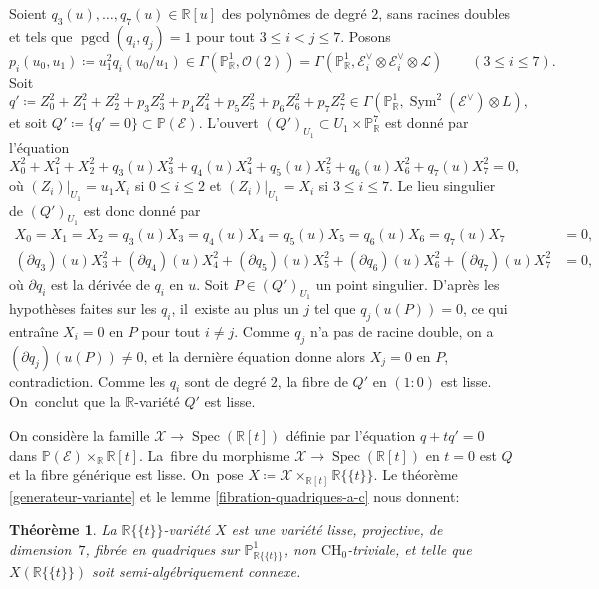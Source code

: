 \documentclass[11pt]{article}
\newcommand{\CH}{\mathrm{CH}}
\newtheorem{thm}{Théorème}[section]
\theoremstyle{definition}
\newcommand{\R}{\mathbb R}
\renewcommand{\P}{\mathbb P}
\newcommand{\mc}[1]{\mathcal{#1}}
\newcommand{\on}[1]{\operatorname{#1}}
\newcommand{\puiseux}{\mathbb{R}\{\!\{t\}\!\}}
\begin{document}
Soient $q_3(u),\dots,q_7(u)\in \R[u]$ des polynômes de degré $2$, sans racines doubles et tels que $\on{pgcd}(q_i,q_j)=1$ pour tout $3\leq i<j\leq 7$. Posons
\[p_i(u_0,u_1)\coloneqq u_1^2q_i(u_0/u_1)\in \Gamma(\P^1_\R,\mc{O}(2))=\Gamma(\P^1_\R,\mc{E}_i^\vee\otimes \mc{E}_i^\vee\otimes \mc{L})\qquad (3\leq i\leq 7).\]
Soit
\[q'\coloneqq Z_0^2+Z_1^2+Z_2^2+p_3Z_3^2+p_4Z_4^2+p_5Z_5^2+p_6Z_6^2+p_7Z_7^2\in \Gamma(\P^1_\R, \on{Sym}^2(\mc{E}^\vee)\otimes L),\]
et soit $Q'\coloneqq \{q'=0\}\subset \P(\mc{E})$. L'ouvert $(Q')_{U_1}\subset U_1\times \P^7_\R$ est donné par l'équation
\[X_0^2+X_1^2+X_2^2+q_3(u)X_3^2+q_4(u)X_4^2+q_5(u)X_5^2+q_6(u)X_6^2+q_7(u)X_7^2=0,\]
où $(Z_i)|_{U_1}=u_1X_i$ si $0\leq i\leq 2$ et $(Z_i)|_{U_1}=X_i$ si $3\leq i\leq 7$.
Le lieu singulier de $(Q')_{U_1}$ est donc donné par
\begin{align*}
X_0=X_1=X_2=q_3(u)X_3=q_4(u)X_4=q_5(u)X_5=q_6(u)X_6=q_7(u)X_7&=0,\\
(\partial q_3)(u)X_3^2+(\partial q_4)(u)X_4^2+(\partial q_5)(u)X_5^2+(\partial q_6)(u)X_6^2+(\partial q_7)(u)X_7^2&=0,
\end{align*}
où $\partial q_i$ est la dérivée de $q_i$ en $u$. Soit $P\in (Q')_{U_1}$ un point singulier. D'après les hypothèses faites sur les $q_i$, il~existe au plus un $j$ tel que $q_j(u(P))=0$, ce qui entraîne $X_i=0$ en $P$ pour tout $i\neq j$. Comme $q_j$ n'a pas de racine double, on a $(\partial q_j)(u(P))\neq 0$, et la dernière équation donne alors $X_j=0$ en $P$, contradiction. Comme les $q_i$ sont de degré $2$, la fibre de $Q'$ en $(1:0)$ est lisse. On~conclut que la $\R$-variété $Q'$ est lisse.

On considère la famille $\mc{X}\to \on{Spec}(\R[t])$ définie par l'équation $q+tq'=0$ dans $\P(\mc{E})\times_\R\R[t]$. La~fibre du morphisme $\mc{X}\to \on{Spec}(\R[t])$ en $t=0$ est $Q$ et la fibre générique est lisse. On~pose $X\coloneqq \mc{X}\times_{\R[t]}\puiseux$. Le théorème \ref{generateur-variante} et le lemme \ref{fibration-quadriques-a-c} nous donnent:

\begin{thm}\label{fibres-quadriques-6}
La $\puiseux$-variété $X$ est une variété lisse, projective, de dimension~$7$, fibrée en quadriques sur $\P^1_{\puiseux}$, non $\CH_0$-triviale, et telle que $X(\puiseux)$ soit semi-algébriquement connexe.
\end{thm}
\end{document}
